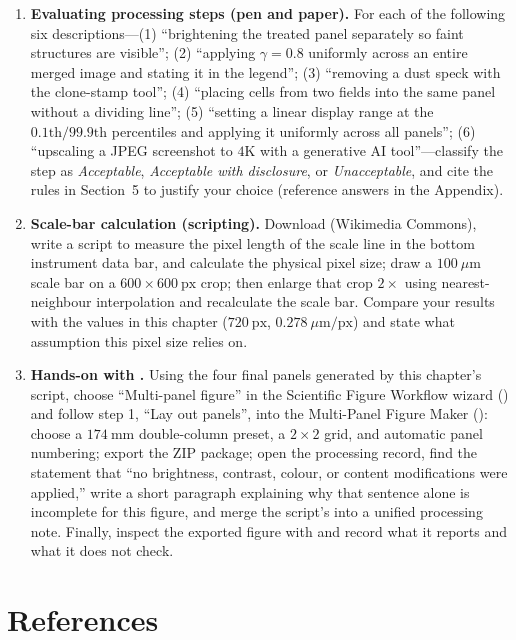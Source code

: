 \begin{enumerate}
\item \textbf{Evaluating processing steps (pen and paper).} For each of the following six descriptions---(1) ``brightening the treated panel separately so faint structures are visible''; (2) ``applying $\gamma = 0.8$ uniformly across an entire merged image and stating it in the legend''; (3) ``removing a dust speck with the clone-stamp tool''; (4) ``placing cells from two fields into the same panel without a dividing line''; (5) ``setting a linear display range at the $0.1\text{th}/99.9\text{th}$ percentiles and applying it uniformly across all panels''; (6) ``upscaling a JPEG screenshot to $4\text{K}$ with a generative AI tool''---classify the step as \emph{Acceptable}, \emph{Acceptable with disclosure}, or \emph{Unacceptable}, and cite the rules in Section~5 to justify your choice (reference answers in the Appendix).
\item \textbf{Scale-bar calculation (scripting).} Download  (Wikimedia Commons), write a script to measure the pixel length of the scale line in the bottom instrument data bar, and calculate the physical pixel size; draw a $100\ \mu\text{m}$ scale bar on a $600 \times 600\ \text{px}$ crop; then enlarge that crop $2\times$ using nearest-neighbour interpolation and recalculate the scale bar. Compare your results with the values in this chapter ($720\ \text{px}$, $0.278\ \mu\text{m/px}$) and state what assumption this pixel size relies on.
\item \textbf{Hands-on with \scidraw{}.} Using the four final panels generated by this chapter's script, choose ``Multi-panel figure'' in the Scientific Figure Workflow wizard () and follow step 1, ``Lay out panels'', into the Multi-Panel Figure Maker (): choose a $174\ \text{mm}$ double-column preset, a $2 \times 2$ grid, and automatic panel numbering; export the ZIP package; open the processing record, find the statement that ``no brightness, contrast, colour, or content modifications were applied,'' write a short paragraph explaining why that sentence alone is incomplete for this figure, and merge the script's  into a unified processing note. Finally, inspect the exported figure with  and record what it reports and what it does not check.
\end{enumerate}

\section*{References}

